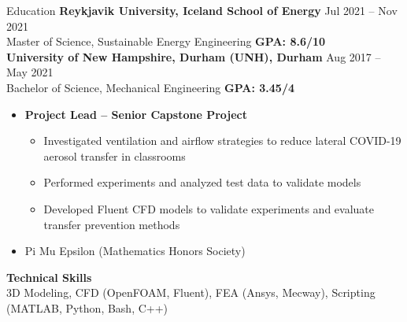 \documentclass{resume}
\begin{document}
\begin{rSection}{Education}
    {\bf Reykjavik University, Iceland School of Energy} \hfill {Jul 2021 -- Nov 2021}
    \\ {Master of Science, Sustainable Energy Engineering} \hfill {\bf{GPA: 8.6/10}}
    \\ {\bf University of New Hampshire, Durham (UNH), Durham} \hfill {Aug 2017 -- May 2021}
    \\ {Bachelor of Science, Mechanical Engineering} \hfill {\bf GPA: 3.45/4}
    \vspace{-0.5em}
    \begin{itemize}[label={\tiny\raisebox{1ex}{\textbullet}}, noitemsep]
        \item {\bf{Project Lead -- Senior Capstone Project}}
            \begin{itemize}[label={\tiny\raisebox{1ex}{\textbullet}}, noitemsep]
                \item Investigated ventilation and airflow strategies to reduce lateral COVID-19 aerosol transfer in classrooms
                \item Performed experiments and analyzed test data to validate models
                \item Developed Fluent CFD models to validate experiments and evaluate transfer prevention methods
            \end{itemize}
        \item Pi Mu Epsilon (Mathematics Honors Society)
    \end{itemize}{}
    \vspace{-0.4em}
    {\bf Technical Skills}
    \\ 3D Modeling, CFD (OpenFOAM, Fluent), FEA (Ansys, Mecway), Scripting (MATLAB, Python, Bash, C++)
    \vspace{-0.4em}
\end{rSection}
\end{document}
